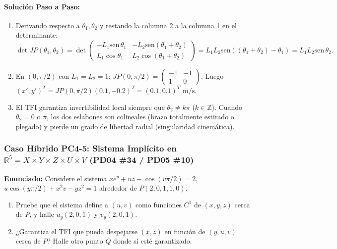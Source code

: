 \documentclass[11pt,a4paper]{article}
\begin{document}
\paragraph{Solución Paso a Paso:}
\begin{enumerate}[label=\textbf{\alph*)}]
  \item Derivando respecto a $\theta_1, \theta_2$ y restando la columna 2 a la columna 1 en el determinante:
  \[ \det JP(\theta_1,\theta_2) = \det\begin{pmatrix} -L_1\text{sen}\,\theta_1 & -L_2\text{sen}(\theta_1+\theta_2) \\ L_1\cos\theta_1 & L_2\cos(\theta_1+\theta_2) \end{pmatrix} = L_1 L_2 \text{sen}\left((\theta_1+\theta_2)-\theta_1\right) = L_1 L_2 \text{sen}\,\theta_2. \]
  \item En $(0,\pi/2)$ con $L_1=L_2=1$: $JP(0,\pi/2) = \begin{pmatrix} -1 & -1 \\ 1 & 0 \end{pmatrix}$. Luego $(x', y')^T = JP(0,\pi/2)(0.1, -0.2)^T = (0.1, 0.1)^T\text{ m/s}$.
  \item El TFI garantiza invertibilidad local siempre que $\theta_2 \neq k\pi$ ($k\in\mathbb{Z}$). Cuando $\theta_2 = 0$ o $\pi$, los dos eslabones son colineales (brazo totalmente estirado o plegado) y pierde un grado de libertad radial (singularidad cinemática).
\end{enumerate}

\subsubsection*{Caso Híbrido PC4-5: Sistema Implícito en $\mathbb{R}^5 = X\times Y\times Z\times U\times V$ (PD04 \#34 / PD05 \#10)}
\begin{tcolorbox}[colback=white,colframe=gray!40,arc=1mm,boxrule=0.5pt]
\textbf{Enunciado:} Considere el sistema $x e^y + uz - \cos(v\pi/2) = 2$, $u\cos(y\pi/2) + x^2v - yz^2 = 1$ alrededor de $P(2,0,1,1,0)$.
\begin{enumerate}[label=\textbf{\alph*)}]
  \item Pruebe que el sistema define a $(u,v)$ como funciones $C^1$ de $(x,y,z)$ cerca de $P$, y halle $u_y(2,0,1)$ y $v_y(2,0,1)$.
  \item ¿Garantiza el TFI que pueda despejarse $(x,z)$ en función de $(y,u,v)$ cerca de $P$? Halle otro punto $Q$ donde sí esté garantizado.
\end{enumerate}
\end{tcolorbox}
\end{document}
